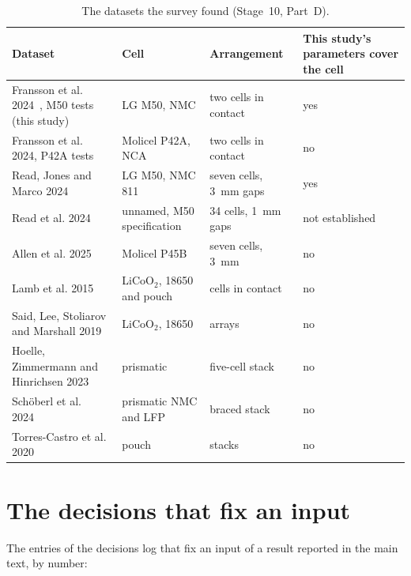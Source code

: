 \documentclass[preprint,12pt]{elsarticle}
\begin{document}
\begin{table}[h]
\centering
\footnotesize
\caption{The datasets the survey found (Stage~10, Part~D).}
\label{tab:s-survey}
\begin{tabular}{p{}p{}p{}p{}}
\toprule
Dataset & Cell & Arrangement & This study's parameters cover the cell \\
\midrule
Fransson et al. 2024~\cite{fransson2024exploring}, M50 tests (this study) & LG M50, NMC & two cells in contact & yes \\
Fransson et al. 2024, P42A tests & Molicel P42A, NCA & two cells in contact & no \\
Read, Jones and Marco 2024~\cite{read2024sidewall} & LG M50, NMC 811 & seven cells, 3~mm gaps & yes \\
Read et al. 2024~\cite{read2024barrier} & unnamed, M50 specification & 34 cells, 1~mm gaps & not established \\
Allen et al. 2025~\cite{allen2025sleeves} & Molicel P45B & seven cells, 3~mm & no \\
Lamb et al. 2015~\cite{lamb2015failure} & LiCoO$_2$, 18650 and pouch & cells in contact & no \\
Said, Lee, Stoliarov and Marshall 2019~\cite{said2019cascading} & LiCoO$_2$, 18650 & arrays & no \\
Hoelle, Zimmermann and Hinrichsen 2023~\cite{hoelle2023simulation} & prismatic & five-cell stack & no \\
Sch\"oberl et al. 2024~\cite{schoberl2024propagation} & prismatic NMC and LFP & braced stack & no \\
Torres-Castro et al. 2020~\cite{torrescastro2020passive} & pouch & stacks & no \\
\bottomrule
\end{tabular}
\end{table}

\section{The decisions that fix an input}
\label{sec:s-decisions}

The entries of the decisions log that fix an input of a result reported in the main text, by number:
\end{document}

